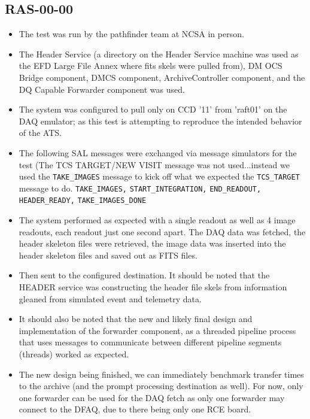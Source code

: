 \documentclass[DM,lsstdraft,STR,toc]{lsstdoc}
\begin{document}
\subsection{RAS-00-00}
\label{sect:detail-RAS-00-00}
\begin{itemize}

  \item{

The test was run by the pathfinder team at NCSA in person.   
}

  \item{
The Header Service (a directory on the Header Service machine was used as the EFD Large File Annex where fits skels were pulled from), DM OCS Bridge component, DMCS component, ArchiveController component, and the DQ Capable Forwarder component was used. 
}
 \item{
The system was configured to pull only on CCD '11' from 'raft01' on the DAQ emulator; as this test is attempting to reproduce the intended behavior of the ATS.
}
 \item{
The following SAL messages were exchanged via message simulators for the test (The TCS TARGET/NEW VISIT message was not used...instead we used the \texttt{TAKE{\_}IMAGES} message to kick off what we expected the \texttt{TCS{\_}TARGET} message to do.
\texttt{TAKE{\_}IMAGES,}
\texttt{START{\_}INTEGRATION,}
\texttt{END{\_}READOUT,}
\texttt{HEADER{\_}READY,}
\texttt{TAKE{\_}IMAGES{\_}DONE}
}
 \item{
The system performed as expected with a single readout as well as 4 image readouts, each readout just one second apart. 
The DAQ data was fetched, the header skeleton files were retrieved, the image data was inserted into the header skeleton files and saved out as FITS files. 
}
 \item{
Then sent to the configured destination. 
It should be noted that the HEADER service was constructing the header file skels from information gleaned from simulated event and telemetry data. 
}
 \item{
It should also be noted that the new and likely final design and implementation of the forwarder component, as a threaded pipeline process that uses messages to communicate between different pipeline segments (threads) worked as expected. 
}
 \item{
The new design being finished, we can immediately benchmark transfer times to the archive (and the prompt processing destination as well). For now, only one forwarder can be used for the DAQ fetch as only one forwarder may connect to the DFAQ, due to there being only one RCE board. 
}
\end{itemize}
\end{document}
